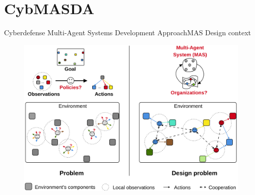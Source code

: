 \section{CybMASDA}

\begin{frame}{Cyberdefense Multi-Agent Systems Development Approach}{MAS Design context}

    \begin{figure}
        \includegraphics[width=0.7\linewidth]{figures/problem_illustration.png}
    \end{figure}

\end{frame}


